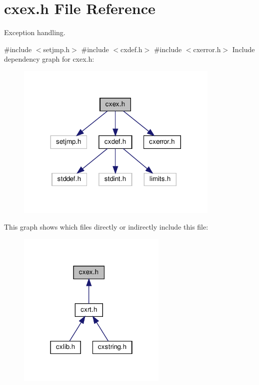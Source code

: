\hypertarget{a00011}{}\section{cxex.\+h File Reference}
\label{a00011}


Exception handling.  


{\ttfamily \#include $<$setjmp.\+h$>$}\newline
{\ttfamily \#include $<$cxdef.\+h$>$}\newline
{\ttfamily \#include $<$cxerror.\+h$>$}\newline
Include dependency graph for cxex.\+h\+:
\nopagebreak
\begin{figure}[H]
\begin{center}
\leavevmode
\includegraphics[width=275pt]{a00012}
\end{center}
\end{figure}
This graph shows which files directly or indirectly include this file\+:
\nopagebreak
\begin{figure}[H]
\begin{center}
\leavevmode
\includegraphics[width=202pt]{a00013}
\end{center}
\end{figure}
